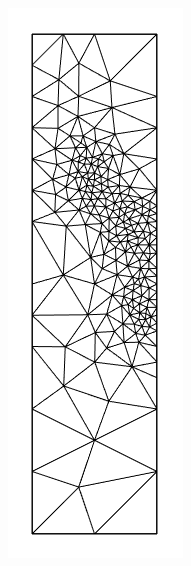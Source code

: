 \documentclass{article}
\begin{document}
\begin{figure}[H] \label{fig:submeshes}
  \centering
  \begin{subfigure}[b]{0.1\linewidth}
    \includegraphics[width=\linewidth]{Fig_submesh1.png}

\end{subfigure}
\end{figure}
\end{document}
